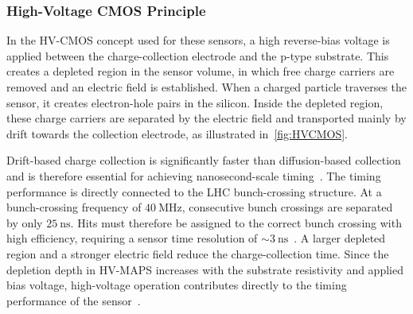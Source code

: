 \subsubsection{High-Voltage CMOS Principle}
In the HV-CMOS concept used for these sensors, a high reverse-bias voltage is applied between the charge-collection electrode and the p-type substrate. This creates a depleted region in the sensor volume, in which free charge carriers are removed and an electric field is established. When a charged particle traverses the sensor, it creates electron-hole pairs in the silicon. Inside the depleted region, these charge carriers are separated by the electric field and transported mainly by drift towards the collection electrode, as illustrated in~\cref{fig:HVCMOS}.\par
Drift-based charge collection is significantly faster than diffusion-based collection and is therefore essential for achieving nanosecond-scale timing~\cite{Aglieri_Rinella2021-ts}. The timing performance is directly connected to the LHC bunch-crossing structure. At a bunch-crossing frequency of $\SI{40}{\mega\hertz}$, consecutive bunch crossings are separated by only $\SI{25}{\nano\second}$. Hits must therefore be assigned to the correct bunch crossing with high efficiency, requiring a sensor time resolution of $\sim\SI{3}{\nano\second}$~\cite{CERN-LHCC-2021-012}. A larger depleted region and a stronger electric field reduce the charge-collection time. Since the depletion depth in HV-MAPS increases with the substrate resistivity and applied bias voltage, high-voltage operation contributes directly to the timing performance of the sensor~\cite{Schmitz2026-je, FouldsHolt_MT_char}.\par

